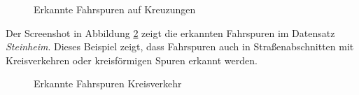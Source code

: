 \begin{figure}[H]
    \centering
    \caption{Erkannte Fahrspuren auf Kreuzungen}
    \label{fig:results_lanes2}
\end{figure}

Der Screenshot in Abbildung \ref{fig:results_lanes3} zeigt die erkannten Fahrspuren im Datensatz \textit{Steinheim}.
Dieses Beispiel zeigt, dass Fahrspuren auch in Straßenabschnitten mit Kreisverkehren oder kreisförmigen Spuren
erkannt werden.


\begin{figure}[H]
    \centering
    \caption{Erkannte Fahrspuren Kreisverkehr}
    \label{fig:results_lanes3}
\end{figure}

